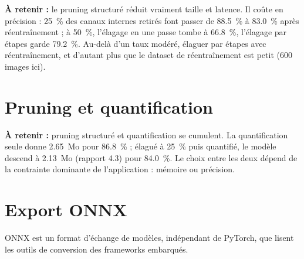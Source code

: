 


\begin{imp}
\textbf{À retenir :} le pruning structuré réduit vraiment taille et latence. Il coûte en précision : 25~\% des canaux internes retirés font passer de 88.5~\% à 83.0~\% après réentraînement ; à 50~\%, l'élagage en une passe tombe à 66.8~\%, l'élagage par étapes garde 79.2~\%. Au-delà d'un taux modéré, élaguer par étapes avec réentraînement, et d'autant plus que le dataset de réentraînement est petit (600 images ici).
\end{imp}

\section{Pruning et quantification}


\begin{imp}
\textbf{À retenir :} pruning structuré et quantification se cumulent. La quantification seule donne 2.65~Mo pour 86.8~\% ; élagué à 25~\% puis quantifié, le modèle descend à 2.13~Mo (rapport 4.3) pour 84.0~\%. Le choix entre les deux dépend de la contrainte dominante de l'application : mémoire ou précision.
\end{imp}

\section{Export ONNX}

ONNX est un format d'échange de modèles, indépendant de PyTorch, que lisent les outils de conversion des frameworks embarqués. \\

